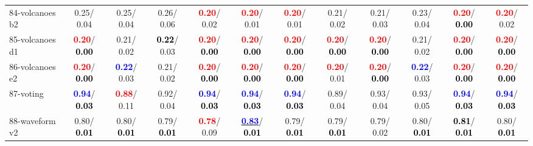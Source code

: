 \begin{table}[h]
\begin{center}
{\begin{tabular}{lc|c|c|c|c|c|c|c|c|c|c}
84-volcanoes b2 &   0.25/  0.04 &   0.25/  0.04 &   0.26/  0.06 & \textcolor{red}{\textbf{  0.20}}/  0.02 & \textcolor{red}{\textbf{  0.20}}/  0.01 & \textcolor{red}{\textbf{  0.20}}/  0.01 &   0.21/  0.02 &   0.21/  0.03 &   0.23/  0.04 & \textcolor{red}{\textbf{  0.20}}/\textcolor{black}{\textbf{  0.00}} & \textcolor{red}{\textbf{  0.20}}/  0.02 \\
85-volcanoes d1 & \textcolor{red}{\textbf{  0.20}}/\textcolor{black}{\textbf{  0.00}} &   0.21/  0.02 & \textcolor{black}{\textbf{  0.22}}/  0.03 & \textcolor{red}{\textbf{  0.20}}/\textcolor{black}{\textbf{  0.00}} & \textcolor{red}{\textbf{  0.20}}/\textcolor{black}{\textbf{  0.00}} & \textcolor{red}{\textbf{  0.20}}/\textcolor{black}{\textbf{  0.00}} & \textcolor{red}{\textbf{  0.20}}/\textcolor{black}{\textbf{  0.00}} & \textcolor{red}{\textbf{  0.20}}/\textcolor{black}{\textbf{  0.00}} &   0.21/  0.02 & \textcolor{red}{\textbf{  0.20}}/\textcolor{black}{\textbf{  0.00}} & \textcolor{red}{\textbf{  0.20}}/\textcolor{black}{\textbf{  0.00}} \\ \hline
86-volcanoes e2 & \textcolor{red}{\textbf{  0.20}}/\textcolor{black}{\textbf{  0.00}} & \textcolor{blue}{\textbf{  0.22}}/  0.03 &   0.21/  0.02 & \textcolor{red}{\textbf{  0.20}}/\textcolor{black}{\textbf{  0.00}} & \textcolor{red}{\textbf{  0.20}}/\textcolor{black}{\textbf{  0.00}} & \textcolor{red}{\textbf{  0.20}}/\textcolor{black}{\textbf{  0.00}} & \textcolor{red}{\textbf{  0.20}}/  0.01 & \textcolor{red}{\textbf{  0.20}}/\textcolor{black}{\textbf{  0.00}} & \textcolor{blue}{\textbf{  0.22}}/  0.03 & \textcolor{red}{\textbf{  0.20}}/\textcolor{black}{\textbf{  0.00}} & \textcolor{red}{\textbf{  0.20}}/\textcolor{black}{\textbf{  0.00}} \\
87-voting & \textcolor{blue}{\textbf{  0.94}}/\textcolor{black}{\textbf{  0.03}} & \textcolor{red}{\textbf{  0.88}}/  0.11 &   0.92/  0.04 & \textcolor{blue}{\textbf{  0.94}}/\textcolor{black}{\textbf{  0.03}} & \textcolor{blue}{\textbf{  0.94}}/\textcolor{black}{\textbf{  0.03}} & \textcolor{blue}{\textbf{  0.94}}/\textcolor{black}{\textbf{  0.03}} &   0.89/  0.04 &   0.93/  0.04 &   0.93/  0.05 & \textcolor{blue}{\textbf{  0.94}}/\textcolor{black}{\textbf{  0.03}} & \textcolor{blue}{\textbf{  0.94}}/\textcolor{black}{\textbf{  0.03}} \\
88-waveform v2 &   0.80/\textcolor{black}{\textbf{  0.01}} &   0.80/\textcolor{black}{\textbf{  0.01}} &   0.79/\textcolor{black}{\textbf{  0.01}} & \textcolor{red}{\textbf{  0.78}}/  0.09 & \underline{\textcolor{blue}{\textbf{  0.83}}}/\textcolor{black}{\textbf{  0.01}} &   0.79/\textcolor{black}{\textbf{  0.01}} &   0.79/\textcolor{black}{\textbf{  0.01}} &   0.79/  0.02 &   0.80/\textcolor{black}{\textbf{  0.01}} & \textcolor{black}{\textbf{  0.81}}/\textcolor{black}{\textbf{  0.01}} &   0.80/\textcolor{black}{\textbf{  0.01}} \\

\end{tabular}}
\end{center}
\end{table}
